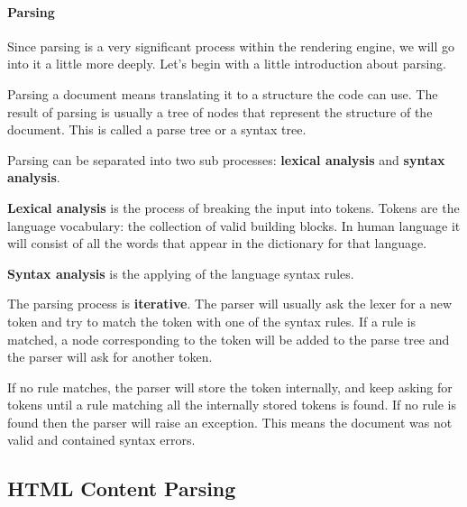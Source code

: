 \documentclass[a4paper, justified, notoc]{tufte-handout} %
\begin{document}
\paragraph{Parsing} %
\label{par:parsing}
Since parsing is a very significant process within the rendering engine, we will go into it a little more deeply. Let's begin with a little introduction about parsing.

Parsing a document means translating it to a structure the code can use. The result of parsing is usually a tree of nodes that represent the structure of the document. This is called a parse tree or a syntax tree.

Parsing can be separated into two sub processes: \textbf{lexical analysis} and \textbf{syntax analysis}.

\textbf{Lexical analysis} is the process of breaking the input into tokens. Tokens are the language vocabulary: the collection of valid building blocks. In human language it will consist of all the words that appear in the dictionary for that language.

\textbf{Syntax analysis} is the applying of the language syntax rules.

The parsing process is \textbf{iterative}. The parser will usually ask the lexer for a new token and try to match the token with one of the syntax rules. If a rule is matched, a node corresponding to the token will be added to the parse tree and the parser will ask for another token.

If no rule matches, the parser will store the token internally, and keep asking for tokens until a rule matching all the internally stored tokens is found. If no rule is found then the parser will raise an exception. This means the document was not valid and contained syntax errors.

\subsection{HTML Content Parsing} %
\label{sub:parsing_html_content}
\end{document}
